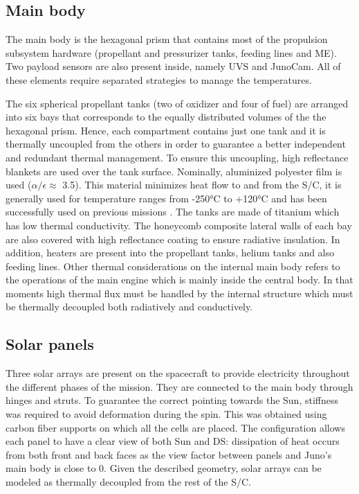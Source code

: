     \subsection{Main body}
    \label{subsec:main_body}
    The main body is the hexagonal prism that contains most of the propulsion subsystem hardware (propellant and pressurizer tanks, feeding lines and ME). Two payload sensors are also present inside, namely UVS and JunoCam. All of these elements require separated strategies to manage the temperatures. 
    
    The six spherical propellant tanks (two of oxidizer and four of fuel) are arranged into six bays that corresponds to the equally distributed volumes of the the hexagonal prism. Hence, each compartment contains just one tank and it is thermally uncoupled from the others in order to guarantee a better independent and redundant thermal management. To ensure this uncoupling, high reflectance blankets are used over the tank surface. Nominally, aluminized polyester film is used ($\alpha / \epsilon \approx$ 3.5). This material minimizes heat flow to and from the S/C, it is generally used for temperature ranges from -250°C to +120°C and has been successfully used on previous missions \cite{alum_poly}. The tanks are made of titanium which has low thermal conductivity. 
    The honeycomb composite lateral walls of each bay are also covered with high reflectance coating to ensure radiative insulation.
    In addition, heaters are present into the propellant tanks, helium tanks and also feeding lines. \cite{LL_early_cruise}
    Other thermal considerations on the internal main body refers to the  operations of the main engine which is mainly inside the central body. In that moments high thermal flux must be handled by the internal structure which must be thermally decoupled both radiatively and conductively. %

    \subsection{Solar panels}
    \label{subsec:solar_panels}
    Three solar arrays are present on the spacecraft to provide electricity throughout the different phases of the mission. They are connected to the main body through hinges and struts. To guarantee the correct pointing towards the Sun, stiffness was required to avoid deformation during the spin. This was obtained using carbon fiber supports on which all the cells are placed. The configuration allows each panel to have a clear view of both Sun and DS: dissipation of heat occurs from both front and back faces as the view factor between panels and Juno's main body is close to 0. Given the described geometry, solar arrays can be modeled as thermally decoupled from the rest of the S/C.
     
